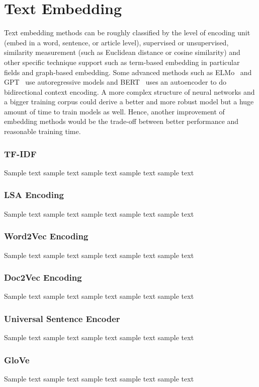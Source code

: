 \section{Text Embedding}
Text embedding methods can be roughly classified by the level of encoding unit (embed in a word, sentence, or article level), supervised or unsupervised, similarity measurement (such as Euclidean distance or cosine similarity) and other specific technique support such as term-based embedding in particular fields and graph-based embedding.
Some advanced methods such as ELMo~\cite{peters2018} and GPT~\cite{brown2020} use autoregressive models and BERT~\cite{niven2019} uses an autoencoder to do bidirectional context encoding.
A more complex structure of neural networks and a bigger training corpus could derive a better and more robust model but a huge amount of time to train models as well.
Hence, another improvement of embedding methods would be the trade-off between better performance and reasonable training time.

\subsubsection{TF-IDF}
Sample text sample text sample text sample text sample text

\subsubsection{LSA Encoding}
Sample text sample text sample text sample text sample text

\subsubsection{Word2Vec Encoding}
Sample text sample text sample text sample text sample text

\subsubsection{Doc2Vec Encoding}
Sample text sample text sample text sample text sample text

\subsubsection{Universal Sentence Encoder}
Sample text sample text sample text sample text sample text

\subsubsection{GloVe}
Sample text sample text sample text sample text sample text

